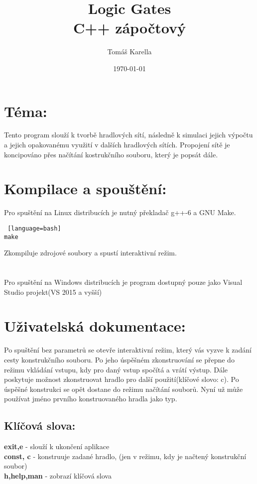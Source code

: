 \documentclass[12pt, oneside]{article}
\title{\vspace{-12ex}Logic Gates \\ C++ zápočtový }
\author{\vspace{-10ex}Tomáš Karella}
\date{\today}
\begin{document}
\maketitle
\section*{Téma:} Tento program slouží k tvorbě hradlových sítí, následně k simulaci jejich výpočtu a jejich opakovanému využití v dalších hradlových sítích. Propojení sítě je koncipováno přes načítání kostrukčního souboru, který je popsát dále.
\section*{Kompilace a spouštění:} Pro spuštění na Linux distribucích je nutný překladač g++-6 a GNU Make.  \\
\begin{lstlisting} [language=bash]
make
\end{lstlisting} 
Zkompiluje zdrojové soubory a spustí interaktivní režim. \\
\\ \\
Pro spuštění na Windows distribucích je program dostupný pouze jako Visual Studio projekt(VS 2015 a vyšší) \\ 
\section*{Uživatelská dokumentace:}
Po spuštění bez parametrů se otevře interaktivní režim, který vás vyzve k zadání cesty konstrukčního souboru. Po jeho úspěšném zkonstruování se přepne do  režimu vkládání vstupu, kdy pro daný vstup spočítá a vrátí výstup. Dále poskytuje možnost zkonstruovat hradlo pro další použití(klíčové slovo: c).  Po úspěšné konstrukci se opět dostane do režimu načítání souborů. Nyní už může používat jméno prvního konstruovaného hradla jako typ. \\
\subsection*{Klíčová slova:} 
\textbf{exit,e} - slouží k ukončení aplikace \\
\textbf{const, c} - konstruuje zadané hradlo, (jen v režimu, kdy je načtený konstrukční soubor) \\
\textbf{h,help,man} - zobrazí klíčová slova \\
\end{document}
